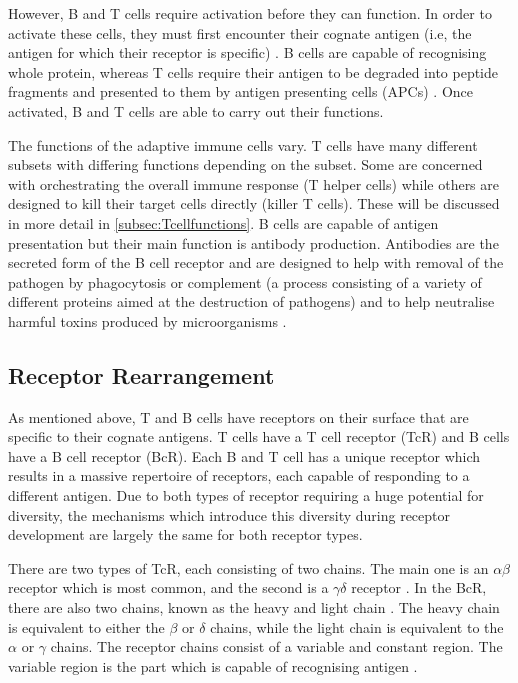 However, B and T cells require activation before they can function.
In order to activate these cells, they must first encounter their cognate antigen (i.e, the antigen for which their receptor is specific) \citep{Parkin2001}.
B cells are capable of recognising whole protein, whereas T cells require their antigen to be degraded into peptide fragments and presented to them by antigen presenting cells (APCs) \citep{Janeway2001}.
Once activated, B and T cells are able to carry out their functions.

The functions of the adaptive immune cells vary.
T cells have many different subsets with differing functions depending on the subset.
Some are concerned with orchestrating the overall immune response (T helper cells) while others are designed to kill their target cells directly (killer T cells).
These will be discussed in more detail in \cref{subsec:Tcellfunctions}.
B cells are capable of antigen presentation but their main function is antibody production.
Antibodies are the secreted form of the B cell receptor and are designed to help with removal of the pathogen by phagocytosis or complement (a process consisting of a variety of different proteins aimed at the destruction of pathogens) and to help neutralise harmful toxins produced by microorganisms \citep{Janeway2008}.

\subsection{Receptor Rearrangement}
\label{subsec:receptorrearrangement}

As mentioned above, T and B cells have receptors on their surface that are specific to their cognate antigens.
T cells have a T cell receptor (TcR) and B cells have a B cell receptor (BcR).
Each B and T cell has a unique receptor which results in a massive repertoire of receptors, each capable of responding to a different antigen.
Due to both types of receptor requiring a huge potential for diversity, the mechanisms which introduce this diversity during receptor development are largely the same for both receptor types.


There are two types of TcR, each consisting of two chains.
The main one is an $\alpha\beta$ receptor which is most common, and the second is a $\gamma\delta$ receptor \citep{Janeway2001}.
In the BcR, there are also two chains, known as the heavy and light chain \citep{Pieper2013}.
The heavy chain is equivalent to either the $\beta$ or $\delta$ chains, while the light chain is equivalent to the $\alpha$ or $\gamma$ chains.
The receptor chains consist of a variable and constant region.
The variable region is the part which is capable of recognising antigen \citep{Pieper2013}.

